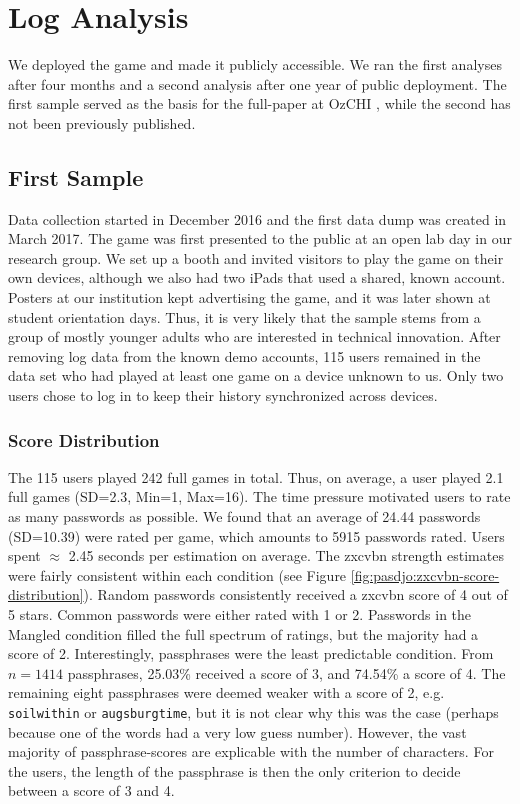 \section{Log Analysis}
We deployed the game and made it publicly accessible. We ran the first analyses after four months and a second analysis after one year of public deployment. The first sample served as the basis for the full-paper at OzCHI \cite{Seitz2017PASDJO}, while the second has not been previously published. 

\subsection{First Sample}
Data collection started in December 2016 and the first data dump was created in March 2017. The game was first presented to the public at an open lab day in our research group. We set up a booth and invited visitors to play the game on their own devices, although we also had two iPads that used a shared, known account. Posters at our institution kept advertising the game, and it was later shown at student orientation days. Thus, it is very likely that the sample stems from a group of mostly younger adults who are interested in technical innovation. After removing log data from the known demo accounts, 115 users remained in the data set who had played at least one game on a device unknown to us. Only two users chose to log in to keep their history synchronized across devices. 

\subsubsection{Score Distribution}

The 115 users played 242 full games in total. Thus, on average, a user played 2.1 full games (SD=2.3, Min=1, Max=16).
The time pressure motivated users to rate as many passwords as possible. We found that an average of 24.44 passwords (SD=10.39) were rated per game, which amounts to 5915 passwords rated. Users spent $\approx$ 2.45 seconds per estimation on average. The zxcvbn strength estimates were fairly consistent within each condition (see Figure \ref{fig:pasdjo:zxcvbn-score-distribution}). Random passwords consistently received a zxcvbn score of 4 out of 5 stars. Common passwords were either rated with 1 or 2. Passwords in the Mangled condition filled the full spectrum of ratings, but the majority had a score of 2. Interestingly, passphrases were the least predictable condition. From $n = 1414$ passphrases, 25.03\% received a score of 3, and 74.54\% a score of 4. The remaining eight passphrases were deemed weaker with a score of 2, e.g. \texttt{soilwithin} or \texttt{augsburgtime}, but it is not clear why this was the case (perhaps because one of the words had a very low guess number). However, the vast majority of passphrase-scores are explicable with the number of characters. For the users, the length of the passphrase is then the only criterion to decide between a score of 3 and 4. 


